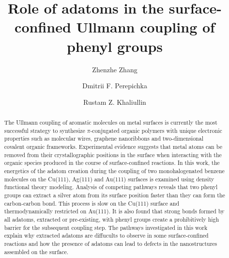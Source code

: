 \documentclass[journal=jacsat,manuscript=article]{achemso}
\title[An \textsf{achemso} demo]
    {Role of adatoms in the surface-confined Ullmann coupling of phenyl groups
    }
\author{Zhenzhe Zhang}
\author{Dmitrii F. Perepichka}%
\author{Rustam Z. Khaliullin}
\affiliation{%
 Department of Chemistry, McGill University, 801 Sherbrooke St West, Montreal, QC H3A 0B8, Canada
}%
\begin{document}
\begin{abstract}
The Ullmann coupling of aromatic molecules on metal surfaces is currently the most successful strategy to synthesize $\pi$-conjugated organic polymers with unique electronic properties such as molecular wires, graphene nanoribbons and two-dimensional covalent organic frameworks. 
Experimental evidence suggests that metal atoms can be removed from their crystallographic positions in the surface when interacting with the organic species produced in the course of surface-confined reactions. In this work, the energetics of the adatom creation during the coupling of two monohalogenated benzene molecules on the Cu(111), Ag(111) and Au(111) surfaces is examined using density functional theory modeling. Analysis of competing pathways reveals that two phenyl groups can extract a silver atom from its surface position faster than they can form the carbon-carbon bond. This process is slow on the Cu(111) surface and thermodynamically restricted on Au(111). It is also found that strong bonds formed by all adatoms, extracted or pre-existing, with phenyl groups create a prohibitively high barrier for the subsequent coupling step. The pathways investigated in this work explain why extracted adatoms are diffucults to observe in some surface-confined reactions and how the presence of adatoms can lead to defects in the nanostructures assembled on the surface.
\end{abstract}

\maketitle




\end{document}
